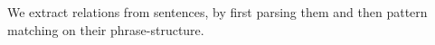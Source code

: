 We extract relations from sentences, by first parsing them and then pattern matching on their phrase-structure.
